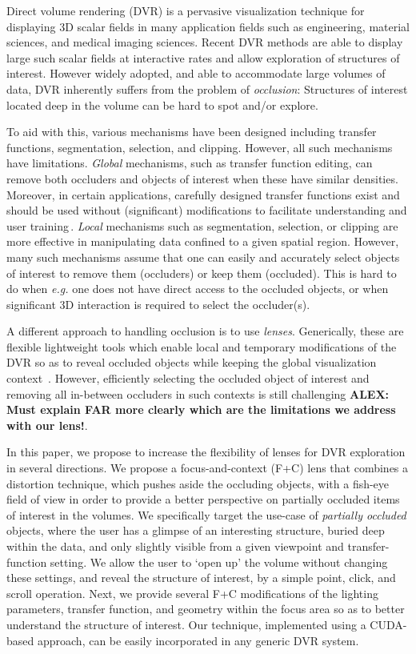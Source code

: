 Direct volume rendering (DVR) is a pervasive visualization technique for displaying 3D scalar fields in many application fields such as engineering, material sciences, and medical imaging sciences. Recent DVR methods are able to display large such scalar fields at interactive rates and allow exploration of structures of interest. However widely adopted, and able to accommodate large volumes of data, DVR inherently suffers from the problem of \emph{occlusion}: Structures of interest located deep in the volume can be hard to spot and/or explore.

To aid with this, various mechanisms have been designed including transfer functions, segmentation, selection, and clipping. However, all such mechanisms have limitations.  \emph{Global} mechanisms, such as transfer function editing, can remove both occluders and objects of interest when these have similar densities. Moreover, in certain applications, carefully designed transfer functions exist and should be used without (significant) modifications to facilitate understanding and user training\,\cite{xxx}. \emph{Local} mechanisms such as segmentation, selection, or clipping are more effective in manipulating data confined to a given spatial region. However, many such mechanisms assume that one can easily and accurately select objects of interest to remove them (occluders) or keep them (occluded). This is hard to do when \emph{e.g.} one does not have direct access to the occluded objects, or when significant 3D interaction is required to select the occluder(s).

A different approach to handling occlusion is to use \emph{lenses}. Generically, these are flexible lightweight tools which enable local and temporary modifications of the DVR so as to reveal occluded objects while keeping the global visualization context~\cite{595268,CGF:CGF12871,xxx}. However, efficiently selecting the occluded object of interest and removing all in-between occluders in such contexts is still challenging \textbf{ALEX: Must explain FAR more clearly which are the limitations we address with our lens!}. 

In this paper, we propose to increase the flexibility of lenses for DVR exploration in several directions. We propose a focus-and-context (F+C) lens that combines a distortion technique, which pushes aside the occluding objects, with a fish-eye field of view in order to provide a better perspective on partially occluded items of interest in the volumes. We specifically target the use-case of \emph{partially occluded} objects, where the user has a glimpse of an interesting structure, buried deep within the data, and only slightly visible from a given viewpoint and transfer-function setting. We allow the user to `open up' the volume without changing these settings, and reveal the structure of interest, by a simple point, click, and scroll operation. Next, we provide several F+C modifications of the lighting parameters, transfer function, and geometry within the focus area so as to better understand the structure of interest. Our technique, implemented using a CUDA-based approach, can be easily incorporated in any generic DVR system.
 

